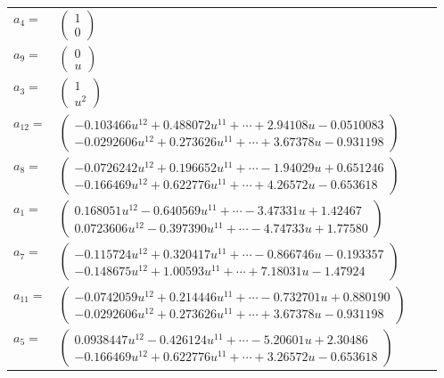 \documentclass[1p]{elsarticle_modified}
\theoremstyle{definition}
\begin{document}
\begin{tabular}{m{7pt} m{180pt} m{7pt} m{180pt} }
\flushright $a_{4}=$&$\begin{pmatrix}1\\0\end{pmatrix}$ \\
\flushright $a_{9}=$&$\begin{pmatrix}0\\u\end{pmatrix}$ \\
\flushright $a_{3}=$&$\begin{pmatrix}1\\u^2\end{pmatrix}$ \\
\flushright $a_{12}=$&$\begin{pmatrix}-0.103466 u^{12}+0.488072 u^{11}+\cdots+2.94108 u-0.0510083\\-0.0292606 u^{12}+0.273626 u^{11}+\cdots+3.67378 u-0.931198\end{pmatrix}$ \\
\flushright $a_{8}=$&$\begin{pmatrix}-0.0726242 u^{12}+0.196652 u^{11}+\cdots-1.94029 u+0.651246\\-0.166469 u^{12}+0.622776 u^{11}+\cdots+4.26572 u-0.653618\end{pmatrix}$ \\
\flushright $a_{1}=$&$\begin{pmatrix}0.168051 u^{12}-0.640569 u^{11}+\cdots-3.47331 u+1.42467\\0.0723606 u^{12}-0.397390 u^{11}+\cdots-4.74733 u+1.77580\end{pmatrix}$ \\
\flushright $a_{7}=$&$\begin{pmatrix}-0.115724 u^{12}+0.320417 u^{11}+\cdots-0.866746 u-0.193357\\-0.148675 u^{12}+1.00593 u^{11}+\cdots+7.18031 u-1.47924\end{pmatrix}$ \\
\flushright $a_{11}=$&$\begin{pmatrix}-0.0742059 u^{12}+0.214446 u^{11}+\cdots-0.732701 u+0.880190\\-0.0292606 u^{12}+0.273626 u^{11}+\cdots+3.67378 u-0.931198\end{pmatrix}$ \\
\flushright $a_{5}=$&$\begin{pmatrix}0.0938447 u^{12}-0.426124 u^{11}+\cdots-5.20601 u+2.30486\\-0.166469 u^{12}+0.622776 u^{11}+\cdots+3.26572 u-0.653618\end{pmatrix}$ \\

\end{tabular}
\end{document}
